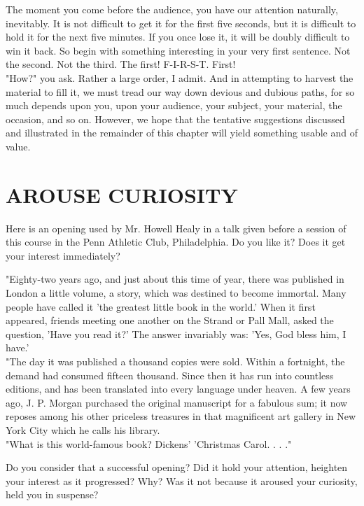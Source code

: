 \documentclass[10pt]{article}
\begin{document}
The moment you come before the audience, you have our attention naturally, inevitably. It is not difficult to get it for the first five seconds, but it is difficult to hold it for the next five minutes. If you once lose it, it will be doubly difficult to win it back. So begin with something interesting in your very first sentence. Not the second. Not the third. The first! F-I-R-S-T. First!\\
"How?" you ask. Rather a large order, I admit. And in attempting to harvest the material to fill it, we must tread our way down devious and dubious paths, for so much depends upon you, upon your audience, your subject, your material, the occasion, and so on. However, we hope that the tentative suggestions discussed and illustrated in the remainder of this chapter will yield something usable and of value.

\section*{AROUSE CURIOSITY}
Here is an opening used by Mr. Howell Healy in a talk given before a session of this course in the Penn Athletic Club, Philadelphia. Do you like it? Does it get your interest immediately?

\begin{displayquote}
"Eighty-two years ago, and just about this time of year, there was published in London a little volume, a story, which was destined to become immortal. Many people have called it 'the greatest little book in the world.' When it first appeared, friends meeting one another on the Strand or Pall Mall, asked the question, 'Have you read it?' The answer invariably was: 'Yes, God bless him, I have.'\\
"The day it was published a thousand copies were sold. Within a fortnight, the demand had consumed fifteen thousand. Since then it has run into countless editions, and has been translated into every language under heaven. A few years ago, J. P. Morgan purchased the original manuscript for a fabulous sum; it now reposes among his other priceless treasures in that magnificent art gallery in New York City which he calls his library.\\
"What is this world-famous book? Dickens' 'Christmas Carol. . . ."
\end{displayquote}

Do you consider that a successful opening? Did it hold your attention, heighten your interest as it progressed? Why? Was it not because it aroused your curiosity, held you in suspense?
\end{document}

